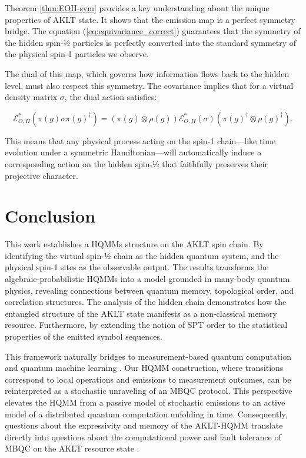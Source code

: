 \documentclass[12pt,a4paper]{article}
\begin{document}
  Theorem \ref{thm:EOH-sym} provides a key understanding about the unique properties of AKLT state. It shows that the emission map is a perfect symmetry bridge. The equation (\ref{eq:equivariance_correct}) guarantees that the  symmetry of the hidden spin-½ particles  is perfectly converted into the standard symmetry of the physical spin-1 particles we observe.

 The dual of this map, which governs how information flows back to the hidden level, must also respect this symmetry. The  covariance implies that for a virtual density matrix \(\sigma\), the dual action satisfies:

\[
\mathcal{E}_{O,H}^*\left( \pi(g) \sigma \pi(g)^\dagger \right) = \left( \pi(g) \otimes \rho(g) \right) \mathcal{E}_{O,H}^*(\sigma) \left( \pi(g)^\dagger \otimes \rho(g)^\dagger \right).
\]

This means that any physical process acting on the spin-1 chain—like time evolution under a symmetric Hamiltonian—will automatically induce a corresponding action on the hidden spin-½  that faithfully preserves their projective character.



\section{  Conclusion }\label{Sect_Disc_Concl}

This work establishes a   HQMMs structure  on the AKLT spin chain. By identifying the virtual spin-½ chain  as the hidden quantum system, and the physical spin-1 sites as the observable output. The results transforms the algebraic-probabilistic  HQMMs  into a model grounded in many-body quantum physics, revealing  connections between quantum memory, topological order, and  correlation structures. The analysis of the hidden   chain demonstrates how the entangled structure of the AKLT state manifests as a non-classical memory resource. Furthermore, by extending the notion of  SPT  order   to the statistical properties of the emitted symbol sequences.


This framework naturally bridges to measurement-based quantum computation   \cite{BBDRN09} and quantum machine learning \cite{J22}.  Our HQMM construction, where transitions correspond to local operations and emissions to measurement outcomes, can be reinterpreted as a stochastic unraveling of an MBQC protocol. This perspective elevates the HQMM from a passive model of stochastic emissions to an active model of a distributed quantum computation unfolding in time. Consequently, questions about the expressivity and memory of the AKLT-HQMM translate directly into questions about the computational power and fault tolerance of MBQC on the AKLT resource state \cite{DKLP2002, Von08}.
\end{document}
